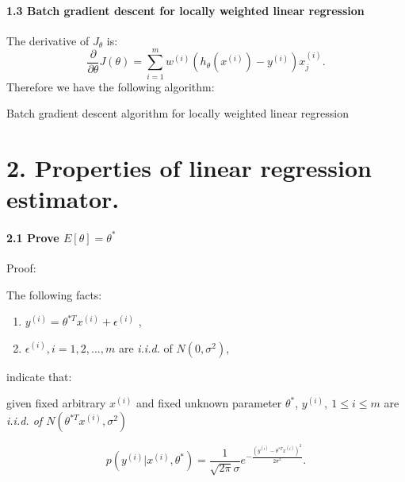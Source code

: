 \documentclass[english,11pt]{article}
\begin{document}
\subsection*{1.3 Batch gradient descent for locally weighted linear regression}

The derivative of $J_{\theta}$ is:
\begin{equation}
\frac{\partial}{\partial\theta}J(\theta)=\sum_{i=1}^{m}w^{(i)}(h_{\theta}(x^{(i)})-y^{(i)})x_{j}^{(i)}.     
\end{equation}
Therefore we have the following algorithm:

\begin{algorithm}[H]
\SetAlgoLined
{}
 \caption{Batch gradient descent algorithm for locally weighted linear regression}
\end{algorithm}








\part*{2. Properties of linear regression estimator.}

\subsection*{2.1 Prove $E[\theta]=\theta^{*}$}

Proof: 

The following facts:
\begin{enumerate}
\item $y^{(i)}=\theta^{*T}x^{(i)}+\epsilon^{(i)}$ ,
\item $\epsilon^{(i)},i=1,2,...,m$ are \emph{i.i.d.} of $N(0,\sigma^{2})$,
\end{enumerate}
indicate that:

given fixed arbitrary $x^{(i)}$ and fixed unknown parameter $\theta^{*}$,
$y^{(i)},\ 1\le i\le m$ are \emph{i.i.d. of $N(\theta^{*T}x^{(i)},\sigma^{2})$} 

\begin{equation}
p(y^{(i)}|x^{(i)},\theta^{*})=\frac{1}{\sqrt{2\pi}\sigma}e^{-\frac{(y^{(i)}-\theta^{*T}x^{(i)})^{2}}{2\sigma^{2}}}.    
\end{equation}
\end{document}
